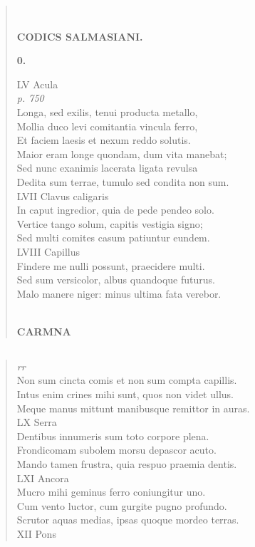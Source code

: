 \documentclass[11pt, a4paper]{report}
\begin{document}
\begin{verse}
        ﻿\pagebreak 
    \begin{center} \textbf{CODICS SALMASIANI.} \end{center}\begin{center} \textbf{0.} \end{center}LV Acula \\ \textit{p. 750} \\ Longa, sed exilis, tenui producta metallo, \\ Mollia duco levi comitantia vincula ferro, \\ Et faciem laesis et nexum reddo solutis. \\ Maior eram longe quondam, dum vita manebat; \\ Sed nunc exanimis lacerata ligata revulsa \\ Dedita sum terrae, tumulo sed condita non sum. \\ LVII Clavus caligaris \\ In caput ingredior, quia de pede pendeo solo. \\ Vertice tango solum, capitis vestigia signo; \\ Sed multi comites casum patiuntur eundem. \\ LVIII Capillus \\ Findere me nulli possunt, praecidere multi. \\ Sed sum versicolor, albus quandoque futurus. \\ Malo manere niger: minus ultima fata verebor. \\ 
        ﻿\pagebreak 
     \marginpar{[236]} \begin{center} \textbf{CARMNA} \end{center}
      \end{verse}
  
            \subsection*{}
      \begin{verse}
      \textit{rr} \\ Non sum cincta comis et non sum compta capillis. \\ Intus enim crines mihi sunt, quos non videt ullus. \\ Meque manus mittunt manibusque remittor in auras. \\ LX Serra \\ Dentibus innumeris sum toto corpore plena. \\ Frondicomam subolem morsu depascor acuto. \\ Mando tamen frustra, quia respuo praemia dentis. \\ LXI Ancora \\ Mucro mihi geminus ferro coniungitur uno. \\ Cum vento luctor, cum gurgite pugno profundo. \\ Scrutor aquas medias, ipsas quoque mordeo terras. \\ XII Pons \\ 
      \end{verse}
  
\end{document}
